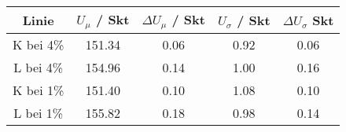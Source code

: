 \begin{tabular}{SSSSS}
\toprule
{Linie}     & {$U_\mu$ / Skt} & {$\Delta U_\mu$ / Skt} & {$U_\sigma$ / Skt} & {$\Delta U_\sigma$ Skt} \\ \midrule
{K bei 4\%} & 151.34    & 0.06          & 0.92         & 0.06          \\
{L bei 4\%} & 154.96    & 0.14          & 1.00         & 0.16          \\
{K bei 1\%} & 151.40    & 0.10          & 1.08         & 0.10          \\
{L bei 1\%} & 155.82    & 0.18          & 0.98         & 0.14          \\ \bottomrule
\end{tabular}